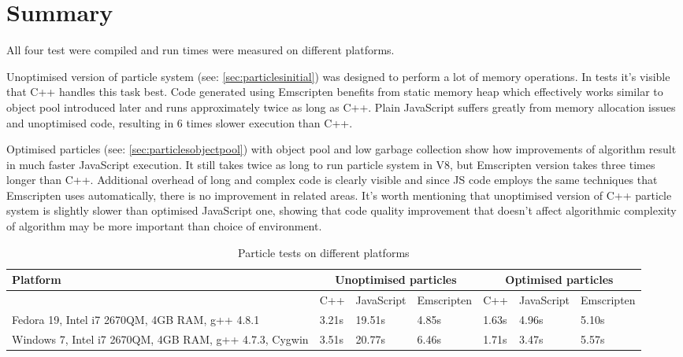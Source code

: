 \chapter{Summary}
\label{cha:summary}

All four test were compiled and run times were measured on different platforms.

Unoptimised version of particle system (see: \ref{sec:particlesinitial}) was designed to perform a lot of memory operations. In tests it's visible that C++ handles this task best. Code generated using Emscripten benefits from static memory heap which effectively works similar to object pool introduced later and runs approximately twice as long as C++. Plain JavaScript suffers greatly from memory allocation issues and unoptimised code, resulting in 6 times slower execution than C++.

Optimised particles (see: \ref{sec:particlesobjectpool}) with object pool and low garbage collection show how improvements of algorithm result in much faster JavaScript execution. It still takes twice as long to run particle system in V8, but Emscripten version takes three times longer than C++. Additional overhead of long and complex code is clearly visible and since JS code employs the same techniques that Emscripten uses automatically, there is no improvement in related areas. It's worth mentioning that unoptimised version of C++ particle system is slightly slower than optimised JavaScript one, showing that code quality improvement that doesn't affect algorithmic complexity of algorithm may be more important than choice of environment.

\begin{table}[h!]
\caption{Particle tests on different platforms}
\label{table:benchmarks}
\begin{tabular}{|p{4cm}||l|l|l||l|l|l|}
  	\hline
   Platform & \multicolumn{3}{c}{Unoptimised particles} & \multicolumn{3}{c}{Optimised particles}\\ \hline
   & C++ & JavaScript & Emscripten & C++ & JavaScript & Emscripten\\ \hline
   Fedora 19, Intel i7 2670QM, 4GB RAM, g++ 4.8.1 & 3.21s & 19.51s & 4.85s & 1.63s & 4.96s & 5.10s \\ \hline
   Windows 7, Intel i7 2670QM, 4GB RAM, g++ 4.7.3, Cygwin & 3.51s & 20.77s & 6.46s & 1.71s & 3.47s & 5.57s \\ \hline
\end{tabular}
\end{table}

